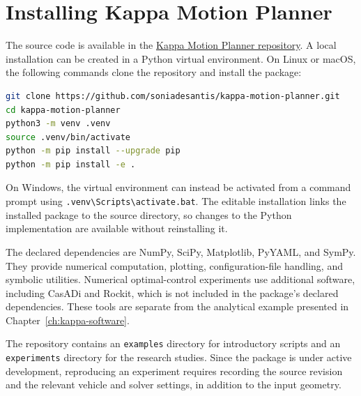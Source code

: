 \chapter{Installing Kappa Motion Planner}\label{app:kappa-installation}
\label{sec:kappa-installation}

The source code is available in the
\href{https://github.com/soniadesantis/kappa-motion-planner}{Kappa Motion Planner repository}.
A local installation can be created in a Python virtual environment. On Linux
or macOS, the following commands clone the repository and install the package:

\begin{lstlisting}[language=bash]
git clone https://github.com/soniadesantis/kappa-motion-planner.git
cd kappa-motion-planner
python3 -m venv .venv
source .venv/bin/activate
python -m pip install --upgrade pip
python -m pip install -e .
\end{lstlisting}

On Windows, the virtual environment can instead be activated from a command
prompt using \texttt{.venv\textbackslash Scripts\textbackslash activate.bat}.
The editable installation links the installed package to the source directory,
so changes to the Python implementation are available without reinstalling it.

The declared dependencies are NumPy, SciPy, Matplotlib, PyYAML, and SymPy. They
provide numerical computation, plotting, configuration-file handling, and
symbolic utilities. Numerical optimal-control experiments use additional
software, including CasADi and Rockit, which is not included in the package's
declared dependencies. These tools are separate from the analytical example
presented in Chapter~\ref{ch:kappa-software}.

The repository contains an \texttt{examples} directory for introductory scripts
and an \texttt{experiments} directory for the research studies. Since the package
is under active development, reproducing an experiment requires recording the
source revision and the relevant vehicle and solver settings, in addition to
the input geometry.

